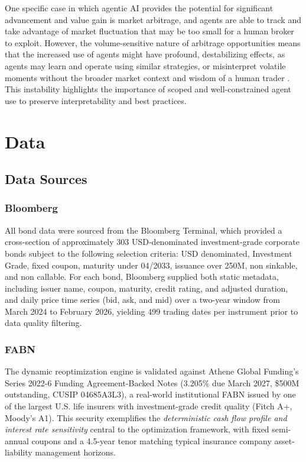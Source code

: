 \documentclass[12pt]{article}
\begin{document}
One specific case in which agentic AI provides the potential for significant advancement and value gain is market arbitrage, and agents are able to track and take advantage of market fluctuation that may be too small for a human broker to exploit. However, the volume-sensitive nature of arbitrage opportunities means that the increased use of agents might have profound, destabilizing effects, as agents may learn and operate using similar strategies, or misinterpret volatile moments without the broader market context and wisdom of a human trader \parencite{Aldridge2026AgenticSurvey}. This instability highlights the importance of scoped and well-constrained agent use to preserve interpretability and best practices. 


\section{Data}

\subsection{Data Sources}

\subsubsection{Bloomberg}

All bond data were sourced from the Bloomberg Terminal, which provided a cross-section of approximately 303 USD-denominated investment-grade corporate bonds subject to the following selection criteria: USD denominated, Investment Grade, fixed coupon, maturity under 04/2033, issuance over 250M, non sinkable, and non callable. For each bond, Bloomberg supplied both static metadata, including issuer name, coupon, maturity, credit rating, and adjusted duration, and daily price time series (bid, ask, and mid) over a two-year window from March 2024 to February 2026, yielding 499 trading dates per instrument prior to data quality filtering.

\subsubsection{FABN}

The dynamic reoptimization engine is validated against Athene Global Funding's Series 2022-6 Funding Agreement-Backed Notes (3.205\% due March 2027, \$500M outstanding, CUSIP 04685A3L3), a real-world institutional FABN issued by one of the largest U.S. life insurers with investment-grade credit quality (Fitch A+, Moody's A1). This security exemplifies the \emph{deterministic cash flow profile and interest rate sensitivity} central to the optimization framework, with fixed semi-annual coupons and a 4.5-year tenor matching typical insurance company asset-liability management horizons.
\end{document}
